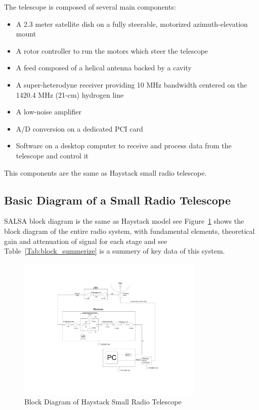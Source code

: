 \documentclass[conference]{IEEEtran}
\begin{document}
The telescope is composed of several main components:
\begin{itemize}
\item A 2.3 meter satellite dish on a fully steerable, motorized azimuth-elevation mount
\item A rotor controller to run the motors which steer the telescope
\item A feed composed of a helical antenna backed by a cavity
\item A super-heterodyne receiver providing 10 MHz bandwidth centered on the 1420.4 MHz (21-cm) hydrogen line
\item A low-noise amplifier
\item A/D conversion on a dedicated PCI card
\item Software on a desktop computer to receive and process data from the telescope and control it
\end{itemize}

This components are the same as Haystack small radio telescope\cite{DustinJohnson2012}.

\subsection{Basic Diagram of a Small Radio Telescope}

SALSA block diagram is the same as Haystack model see Figure~\ref{fig:block_figure} shows the block diagram of the entire radio system, with fundamental elements, theoretical gain and attenuation of signal for each stage and see Table~\ref{Tab:block_summerize} is a summery of key data of this system\cite{DustinJohnson2012}.

\begin{figure}[htbp]
\centerline{\includegraphics[width=3.5in]{block.pdf}}
\caption{Block Diagram of Haystack Small Radio Telescope}
\label{fig:block_figure}
\end{figure}
\end{document}
